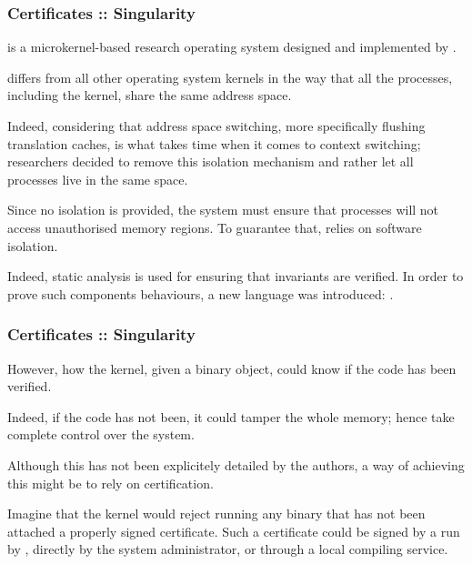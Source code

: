 
\begin{frame}
  \frametitle{Certificates :: Singularity}

   is a microkernel-based research operating system designed
  and implemented by .

  \-

   differs from all other operating system kernels in the
  way that all the processes, including the kernel, share the same address
  space.

  \-

  Indeed, considering that address space switching, more specifically flushing
  translation caches, is what takes time when it comes to context switching;
   researchers decided to remove this isolation mechanism
  and rather let all processes live in the same space.

  \-

  Since no isolation is provided, the system must ensure that processes will
  not access unauthorised memory regions. To guarantee that, 
  relies on software isolation.

  \-

  Indeed, static analysis is used for ensuring that invariants are verified.
  In order to prove such components behaviours, a new language was introduced:
  .
\end{frame}


\begin{frame}
  \frametitle{Certificates :: Singularity}

  However, how the kernel, given a binary object, could know if the code
  has been verified.

  \-

  Indeed, if the code has not been, it could tamper the whole memory; hence
  take complete control over the system.

  \-

  Although this has not been explicitely detailed by the authors,
  a way of achieving this might be to rely on certification.

  \-

  Imagine that the kernel would reject running any binary that has not been
  attached a properly signed certificate. Such a certificate could be signed
  by a  run by ,
  directly by the system administrator, or through a local compiling service.
\end{frame}

